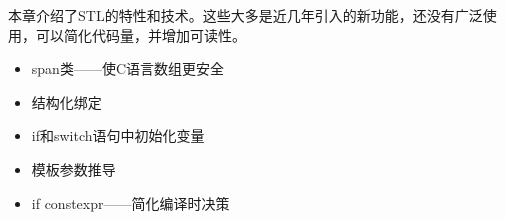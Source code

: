 
本章介绍了STL的特性和技术。这些大多是近几年引入的新功能，还没有广泛使用，可以简化代码量，并增加可读性。

\begin{itemize}
\item 
span类——使C语言数组更安全

\item 
结构化绑定

\item 
if和switch语句中初始化变量

\item 
模板参数推导

\item 
if constexpr——简化编译时决策
\end{itemize}

